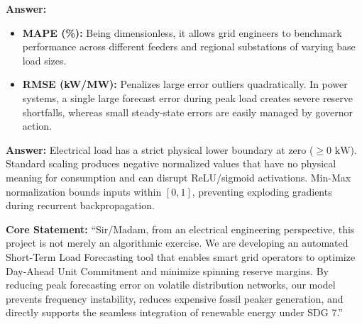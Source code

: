 \documentclass[11pt,a4paper]{article}
\begin{document}
\begin{qnabox}
\textbf{Answer:} 
\begin{itemize}[leftmargin=12pt,itemsep=1pt]
    \item \textbf{MAPE (\%):} Being dimensionless, it allows grid engineers to benchmark performance across different feeders and regional substations of varying base load sizes.
    \item \textbf{RMSE (kW/MW):} Penalizes large error outliers quadratically. In power systems, a single large forecast error during peak load creates severe reserve shortfalls, whereas small steady-state errors are easily managed by governor action.
\end{itemize}
\end{qnabox}

\begin{qnabox}
\textbf{Answer:} Electrical load has a strict physical lower boundary at zero ($\ge 0\text{ kW}$). Standard scaling produces negative normalized values that have no physical meaning for consumption and can disrupt ReLU/sigmoid activations. Min-Max normalization bounds inputs within $[0, 1]$, preventing exploding gradients during recurrent backpropagation.
\end{qnabox}

\begin{qnabox}
\textbf{Core Statement:} ``Sir/Madam, from an electrical engineering perspective, this project is not merely an algorithmic exercise. We are developing an automated Short-Term Load Forecasting tool that enables smart grid operators to optimize Day-Ahead Unit Commitment and minimize spinning reserve margins. By reducing peak forecasting error on volatile distribution networks, our model prevents frequency instability, reduces expensive fossil peaker generation, and directly supports the seamless integration of renewable energy under SDG 7.''
\end{qnabox}
\end{document}
